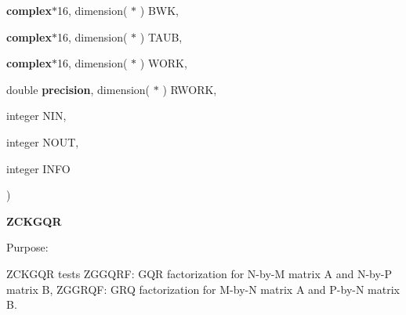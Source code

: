{\begin{DoxyParamCaption}
\item[{{\bf complex}$\ast$16, dimension( $\ast$ )}]{B\+W\+K, }
\item[{{\bf complex}$\ast$16, dimension( $\ast$ )}]{T\+A\+U\+B, }
\item[{{\bf complex}$\ast$16, dimension( $\ast$ )}]{W\+O\+R\+K, }
\item[{double {\bf precision}, dimension( $\ast$ )}]{R\+W\+O\+R\+K, }
\item[{integer}]{N\+I\+N, }
\item[{integer}]{N\+O\+U\+T, }
\item[{integer}]{I\+N\+F\+O}
\end{DoxyParamCaption}
)}\label{group__complex16__eig_gac50da824da9466bc66bfe055ebd480ae}


{\bfseries Z\+C\+K\+G\+Q\+R} 

\begin{DoxyParagraph}{Purpose\+: }
\begin{DoxyVerb} ZCKGQR tests
 ZGGQRF: GQR factorization for N-by-M matrix A and N-by-P matrix B,
 ZGGRQF: GRQ factorization for M-by-N matrix A and P-by-N matrix B.\end{DoxyVerb}
 
\end{DoxyParagraph}

